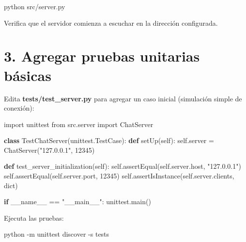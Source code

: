 \documentclass[
  a4paper,
  DIV=11,
  numbers=noendperiod,
  onepage,
  openany]{scrreprt}
\newenvironment{Shaded}{\begin{snugshade}}{\end{snugshade}}
\newcommand{\AttributeTok}[1]{\textcolor[rgb]{0.40,0.45,0.13}{#1}}
\newcommand{\BuiltInTok}[1]{\textcolor[rgb]{0.00,0.23,0.31}{#1}}
\newcommand{\ControlFlowTok}[1]{\textcolor[rgb]{0.00,0.23,0.31}{\textbf{#1}}}
\newcommand{\DecValTok}[1]{\textcolor[rgb]{0.68,0.00,0.00}{#1}}
\newcommand{\ExtensionTok}[1]{\textcolor[rgb]{0.00,0.23,0.31}{#1}}
\newcommand{\ImportTok}[1]{\textcolor[rgb]{0.00,0.46,0.62}{#1}}
\newcommand{\KeywordTok}[1]{\textcolor[rgb]{0.00,0.23,0.31}{\textbf{#1}}}
\newcommand{\NormalTok}[1]{\textcolor[rgb]{0.00,0.23,0.31}{#1}}
\newcommand{\OperatorTok}[1]{\textcolor[rgb]{0.37,0.37,0.37}{#1}}
\newcommand{\StringTok}[1]{\textcolor[rgb]{0.13,0.47,0.30}{#1}}
\newcommand{\VariableTok}[1]{\textcolor[rgb]{0.07,0.07,0.07}{#1}}
\begin{document}
\begin{Shaded}
\begin{Highlighting}[]
\ExtensionTok{python}\NormalTok{ src/server.py}
\end{Highlighting}
\end{Shaded}

Verifica que el servidor comienza a escuchar en la dirección
configurada.

\section{3. Agregar pruebas unitarias
básicas}\label{agregar-pruebas-unitarias-buxe1sicas}

Edita \textbf{tests/test\_server.py} para agregar un caso inicial
(simulación simple de conexión):

\begin{Shaded}
\begin{Highlighting}[]
\ImportTok{import}\NormalTok{ unittest}
\ImportTok{from}\NormalTok{ src.server }\ImportTok{import}\NormalTok{ ChatServer}

\KeywordTok{class}\NormalTok{ TestChatServer(unittest.TestCase):}
    \KeywordTok{def}\NormalTok{ setUp(}\VariableTok{self}\NormalTok{):}
        \VariableTok{self}\NormalTok{.server }\OperatorTok{=}\NormalTok{ ChatServer(}\StringTok{"127.0.0.1"}\NormalTok{, }\DecValTok{12345}\NormalTok{)}

    \KeywordTok{def}\NormalTok{ test\_server\_initialization(}\VariableTok{self}\NormalTok{):}
        \VariableTok{self}\NormalTok{.assertEqual(}\VariableTok{self}\NormalTok{.server.host, }\StringTok{"127.0.0.1"}\NormalTok{)}
        \VariableTok{self}\NormalTok{.assertEqual(}\VariableTok{self}\NormalTok{.server.port, }\DecValTok{12345}\NormalTok{)}
        \VariableTok{self}\NormalTok{.assertIsInstance(}\VariableTok{self}\NormalTok{.server.clients, }\BuiltInTok{dict}\NormalTok{)}

\ControlFlowTok{if} \VariableTok{\_\_name\_\_} \OperatorTok{==} \StringTok{"\_\_main\_\_"}\NormalTok{:}
\NormalTok{    unittest.main()}
\end{Highlighting}
\end{Shaded}

Ejecuta las pruebas:

\begin{Shaded}
\begin{Highlighting}[]
\ExtensionTok{python} \AttributeTok{{-}m}\NormalTok{ unittest discover }\AttributeTok{{-}s}\NormalTok{ tests}
\end{Highlighting}
\end{Shaded}
\end{document}
